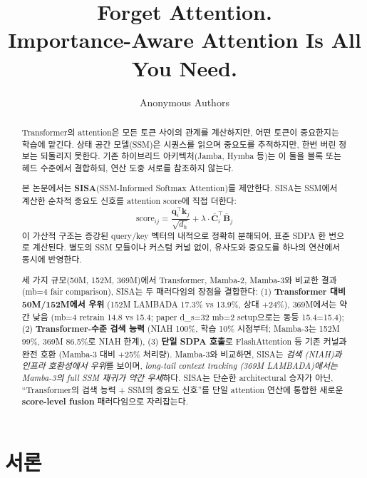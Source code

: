 \documentclass[11pt]{article}
\title{\Large \textbf{Forget Attention.} \\[0.2em]
\Large \textbf{Importance-Aware Attention Is All You Need.}}
\author{Anonymous Authors}
\date{}
\begin{document}
\maketitle

\begin{abstract}
Transformer의 attention은 모든 토큰 사이의 관계를 계산하지만, 어떤 토큰이 중요한지는 학습에 맡긴다. 상태 공간 모델(SSM)은 시퀀스를 읽으며 중요도를 추적하지만, 한번 버린 정보는 되돌리지 못한다. 기존 하이브리드 아키텍처(Jamba, Hymba 등)는 이 둘을 블록 또는 헤드 수준에서 결합하되, 연산 도중 서로를 참조하지 않는다.

본 논문에서는 \textbf{SISA}(SSM-Informed Softmax Attention)를 제안한다. SISA는 SSM에서 계산한 순차적 중요도 신호를 attention score에 직접 더한다:
\[
\text{score}_{ij} = \frac{\mathbf{q}_i^\top \mathbf{k}_j}{\sqrt{d_h}} + \lambda \cdot \bar{\mathbf{C}}_i^\top \bar{\mathbf{B}}_j
\]
이 가산적 구조는 증강된 query/key 벡터의 내적으로 정확히 분해되어, 표준 SDPA 한 번으로 계산된다. 별도의 SSM 모듈이나 커스텀 커널 없이, 유사도와 중요도를 하나의 연산에서 동시에 반영한다.

세 가지 규모(50M, 152M, 369M)에서 Transformer, Mamba-2, Mamba-3와 비교한 결과 (mb=4 fair comparison), SISA는 두 패러다임의 장점을 결합한다: (1) \textbf{Transformer 대비 50M/152M에서 우위} (152M LAMBADA 17.3\% vs 13.9\%, 상대 +24\%), 369M에서는 약간 낮음 (mb=4 retrain 14.8 vs 15.4; paper d_s=32 mb=2 setup으로는 동등 15.4=15.4); (2) \textbf{Transformer-수준 검색 능력} (NIAH 100\%, 학습 10\% 시점부터; Mamba-3는 152M 99\%, 369M 86.5\%로 NIAH 한계), (3) \textbf{단일 SDPA 호출}로 FlashAttention 등 기존 커널과 완전 호환 (Mamba-3 대비 +25\% 처리량). Mamba-3와 비교하면, SISA는 \textit{검색 (NIAH)과 인프라 호환성에서 우위}를 보이며, \textit{long-tail context tracking (369M LAMBADA)에서는 Mamba-3의 full SSM 재귀가 약간 우세}하다. SISA는 단순한 architectural 승자가 아닌, ``Transformer의 검색 능력 + SSM의 중요도 신호''를 단일 attention 연산에 통합한 새로운 \textbf{score-level fusion} 패러다임으로 자리잡는다.
\end{abstract}

\section{서론}
\end{document}

